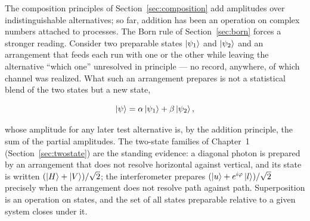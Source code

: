 The composition principles of Section~\ref{sec:composition} add amplitudes over indistinguishable alternatives; so far, addition has been an operation on complex numbers attached to processes. The Born rule of Section~\ref{sec:born} forces a stronger reading. Consider two preparable states $\ket{\psi_1}$ and $\ket{\psi_2}$ and an arrangement that feeds each run with one or the other while leaving the alternative ``which one'' unresolved in principle --- no record, anywhere, of which channel was realized. What such an arrangement prepares is not a statistical blend of the two states but a new state,
\begin{linenomath}
\begin{equation}
    \ket{\psi}=\alpha\ket{\psi_1}+\beta\ket{\psi_2},
\end{equation}
\end{linenomath}
whose amplitude for any later test alternative is, by the addition principle, the sum of the partial amplitudes. The two-state families of Chapter~1 (Section~\ref{sec:twostate}) are the standing evidence: a diagonal photon is prepared by an arrangement that does not resolve horizontal against vertical, and its state is written $(\ket{H}+\ket{V})/\sqrt{2}$; the interferometer prepares $(\ket{u}+e^{i\varphi}\ket{l})/\sqrt{2}$ precisely when the arrangement does not resolve path against path. Superposition is an operation on states, and the set of all states preparable relative to a given system closes under it.

